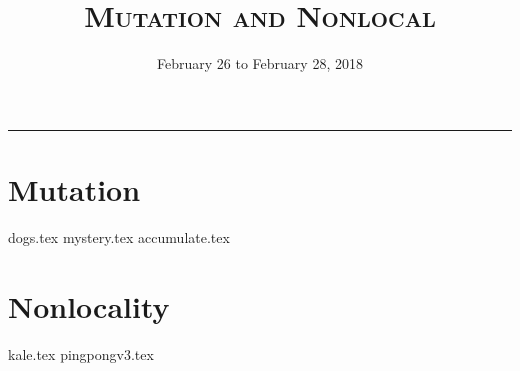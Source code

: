 \documentclass{exam}
\title{\textsc{Mutation and Nonlocal}}
\date{February 26 to February 28, 2018}
\begin{document}
\maketitle
\rule{\textwidth}{0.15em}
\fontsize{12}{15}\selectfont

\section{Mutation}
\begin{questions}
{dogs.tex}
\newpage
{mystery.tex}
\newpage
{accumulate.tex}
\end{questions}

\newpage
\section{Nonlocality}
\begin{questions}
{kale.tex}
{pingpongv3.tex}
\end{questions}
\end{document}
